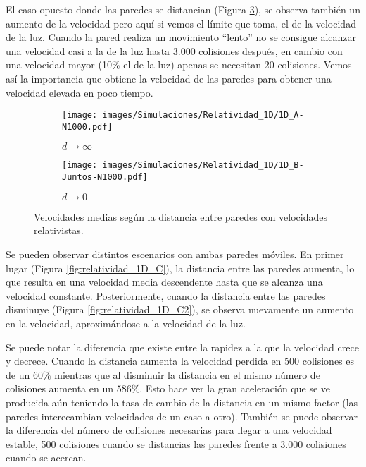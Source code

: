 \documentclass[11pt, spanish]{book}
\begin{document}
\vspace{3mm}

El caso opuesto donde las paredes se distancian (Figura \ref{fig:relatividad_1D_B}), se observa también un aumento de la velocidad pero aquí si vemos el límite que toma, el de la velocidad de la luz. Cuando la pared realiza un movimiento ``lento'' no se consigue alcanzar una velocidad casi a la de la luz hasta 3.000 colisiones después, en cambio con una velocidad mayor (10\% el de la luz) apenas se necesitan 20 colisiones. Vemos así la importancia que obtiene la velocidad de las paredes para obtener una velocidad elevada en poco tiempo.

\vspace{3mm}

\begin{figure}[H]
    \begin{subfigure}[b]{0.5\textwidth}
        \centering
        \texttt{[image: images/Simulaciones/Relatividad\_1D/1D\_A-N1000.pdf]}
        \caption{$d \rightarrow \infty$}
        \label{fig:relatividad_1D_A}
    \end{subfigure}
    \hfill
    \begin{subfigure}[b]{0.5\textwidth}
        \centering
        \texttt{[image: images/Simulaciones/Relatividad\_1D/1D\_B-Juntos-N1000.pdf]}
        \caption{$d \rightarrow 0$}
        \label{fig:relatividad_1D_B}
    \end{subfigure}
    \caption{Velocidades medias según la distancia entre paredes con velocidades relativistas.}
\end{figure}

Se pueden observar distintos escenarios con ambas paredes móviles. En primer lugar (Figura \ref{fig:relatividad_1D_C}), la distancia entre las paredes aumenta, lo que resulta en una velocidad media descendente hasta que se alcanza una velocidad constante. Posteriormente, cuando la distancia entre las paredes disminuye (Figura \ref{fig:relatividad_1D_C2}), se observa nuevamente un aumento en la velocidad, aproximándose a la velocidad de la luz.

\vspace{3mm}

Se puede notar la diferencia que existe entre la rapidez a la que la velocidad crece y decrece. Cuando la distancia aumenta la velocidad perdida en 500 colisiones es de un \( 60\% \) mientras que al disminuir la distancia en el mismo número de colisiones aumenta en un \( 586\% \). Esto hace ver la gran aceleración que se ve producida aún teniendo la tasa de cambio de la distancia en un mismo factor (las paredes interecambian velocidades de un caso a otro). También se puede observar la diferencia del número de colisiones necesarias para llegar a una velocidad estable, 500 colisiones cuando se distancias las paredes frente a 3.000 colisiones cuando se acercan.
\end{document}
